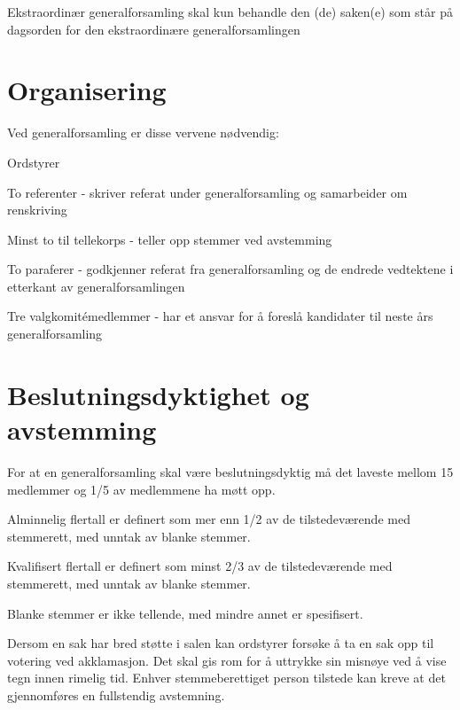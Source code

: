 Ekstraordinær generalforsamling skal kun behandle den (de) saken(e) som står på dagsorden for den ekstraordinære generalforsamlingen
 

\section{Organisering} \label{sec:organisering}
\vspace{23pt}
Ved generalforsamling er disse vervene nødvendig: 

\begin{liste}
	\item Ordstyrer
	\item To referenter - skriver referat under generalforsamling og samarbeider om \mbox{renskriving}
	\item Minst to til tellekorps - teller opp stemmer ved avstemming
	\item To paraferer - godkjenner referat fra generalforsamling og de endrede vedtektene i etterkant av generalforsamlingen
	\item Tre valgkomitémedlemmer - har et ansvar for å foreslå kandidater til neste års generalforsamling
	
\end{liste}

\newpage
\section{Beslutningsdyktighet og avstemming}
\vspace{23pt}

For at en generalforsamling skal være beslutningsdyktig må det laveste mellom 15 medlemmer og 1/5 av medlemmene ha møtt opp. 

\begin{liste}
	\item Alminnelig flertall er definert som mer enn 1/2 av de tilstedeværende med stemmerett, med unntak av blanke stemmer. 
	\item Kvalifisert flertall er definert som minst 2/3 av de tilstedeværende med stemmerett, med unntak av blanke stemmer.
\end{liste}


Blanke stemmer er ikke tellende, med mindre annet er spesifisert.

Dersom en sak har bred støtte i salen kan ordstyrer forsøke å ta en sak opp til votering ved akklamasjon. Det skal gis rom for å uttrykke sin misnøye ved å vise tegn innen rimelig tid. Enhver stemmeberettiget person tilstede kan kreve at det gjennomføres en fullstendig avstemning.


